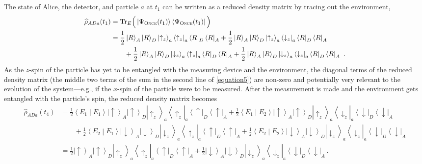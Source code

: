 \documentclass[12pt,onecolumn,secnumarabic,amsmath,amssymb,balancelastpage,nofootinbib]{article}
\newcommand{\bra}[1]{\ensuremath{\left\langle#1\right|}}
\newcommand{\ket}[1]{\ensuremath{\left|#1\right\rangle}}
\newcommand{\bracket}[2]{\ensuremath{\left\langle #1 \middle| #2 \right\rangle}}
\begin{document}
The state of Alice, the detector, and particle $a$ at $t_1$ can be written as a reduced density matrix by tracing out the environment,
\begin{align}
\widehat{\rho}_{ADa}(t_1)&=\text{Tr}_E\Big(\ket{\Psi_{\textsc{Once}}(t_1)}\bra{\Psi_{\textsc{Once}}(t_1)}\Big)
\nonumber
\\
&=\frac{1}{2}\ket{R}_A\ket{R}_{D}\ket{\uparrow_z}_a\bra{\uparrow_z}_a\bra{R}_{D}\bra{R}_A+\frac{1}{2}\ket{R}_A\ket{R}_{D}\ket{\uparrow_z}_a\bra{\downarrow_z}_a\bra{R}_{D}\bra{R}_A
\nonumber
\\
&\qquad +\frac{1}{2}\ket{R}_A\ket{R}_{D}\ket{\downarrow_z}_a\bra{\uparrow_z}_a\bra{R}_{D}\bra{R}_A+\frac{1}{2}\ket{R}_A\ket{R}_{D}\ket{\downarrow_z}_a\bra{\downarrow_z}_a\bra{R}_{D}\bra{R}_A\ .
\label{equation5}
\end{align}
As the $z$-spin of the particle has yet to be entangled with the measuring device and the environment, the diagonal terms of the reduced density matrix (the middle two terms of the sum in the second line of \eqref{equation5}) are non-zero and potentially very relevant to the evolution of the system---e.g., if the $x$-spin of the particle were to be measured.  After the measurement is made and the environment gets entangled with the particle's spin, the reduced density matrix becomes
\begin{align}
\widehat{\rho}_{ADa}(t_4)&=\frac{1}{2}\bracket{E_1}{E_1}\ket{\uparrow}_A\ket{\uparrow}_{D}\ket{\uparrow_z}_a\bra{\uparrow_z}_a\bra{\uparrow}_{D}\bra{\uparrow}_A+\frac{1}{2}\bracket{E_1}{E_2}\ket{\uparrow}_A\ket{\uparrow}_{D}\ket{\uparrow_z}_a\bra{\downarrow_z}_a\bra{\downarrow}_{D}\bra{\downarrow}_A
\nonumber
\\
&\qquad +\frac{1}{2}\bracket{E_2}{E_1}\ket{\downarrow}_A\ket{\downarrow}_{D}\ket{\downarrow_z}_a\bra{\uparrow_z}_a\bra{\uparrow}_{D}\bra{\uparrow}_A+\frac{1}{2}\bracket{E_2}{E_2}\ket{\downarrow}_A\ket{\downarrow}_{D}\ket{\downarrow_z}_a\bra{\downarrow_z}_a\bra{\downarrow}_{D}\bra{\downarrow}_A
\nonumber
\\
&=\frac{1}{2}\ket{\uparrow}_A\ket{\uparrow}_{D}\ket{\uparrow_z}_a\bra{\uparrow_z}_a\bra{\uparrow}_{D}\bra{\uparrow}_A+\frac{1}{2}\ket{\downarrow}_A\ket{\downarrow}_{D}\ket{\downarrow_z}_a\bra{\downarrow_z}_a\bra{\downarrow}_{D}\bra{\downarrow}_A
\ .
\label{redu}
\end{align}
\end{document}
